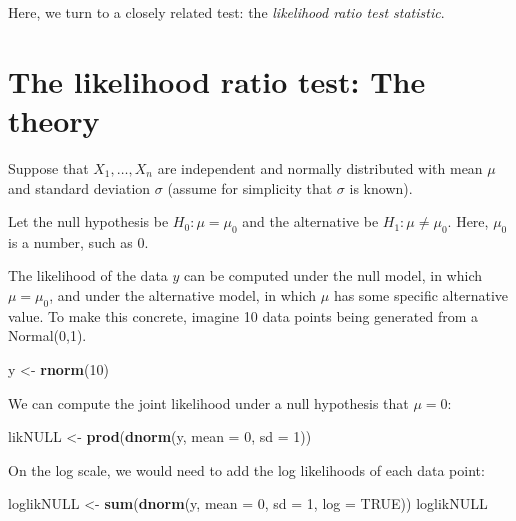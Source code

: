\documentclass[12pt,]{krantz}
\newenvironment{Shaded}{\begin{snugshade}}{\end{snugshade}}
\newcommand{\DataTypeTok}[1]{\textcolor[rgb]{0.13,0.29,0.53}{#1}}
\newcommand{\DecValTok}[1]{\textcolor[rgb]{0.00,0.00,0.81}{#1}}
\newcommand{\KeywordTok}[1]{\textcolor[rgb]{0.13,0.29,0.53}{\textbf{#1}}}
\newcommand{\NormalTok}[1]{#1}
\newcommand{\OtherTok}[1]{\textcolor[rgb]{0.56,0.35,0.01}{#1}}
\newcommand{\StringTok}[1]{\textcolor[rgb]{0.31,0.60,0.02}{#1}}
\begin{document}
Here, we turn to a closely related test: the \emph{likelihood ratio test statistic}.

\hypertarget{the-likelihood-ratio-test-the-theory}{%
\section{The likelihood ratio test: The theory}\label{the-likelihood-ratio-test-the-theory}}

Suppose that \(X_1,\dots, X_n\) are independent and normally distributed with mean \(\mu\) and standard deviation \(\sigma\) (assume for simplicity that \(\sigma\) is known).

Let the null hypothesis be \(H_0: \mu=\mu_0\) and the alternative be \(H_1: \mu\neq \mu_0\). Here, \(\mu_0\) is a number, such as \(0\).

The likelihood of the data \(y\) can be computed under the null model, in which \(\mu=\mu_0\), and under the alternative model, in which \(\mu\) has some specific alternative value. To make this concrete, imagine 10 data points being generated from a Normal(0,1).

\begin{Shaded}
\begin{Highlighting}[]
\NormalTok{y <-}\StringTok{ }\KeywordTok{rnorm}\NormalTok{(}\DecValTok{10}\NormalTok{)}
\end{Highlighting}
\end{Shaded}

We can compute the joint likelihood under a null hypothesis that \(\mu=0\):

\begin{Shaded}
\begin{Highlighting}[]
\NormalTok{likNULL <-}\StringTok{ }\KeywordTok{prod}\NormalTok{(}\KeywordTok{dnorm}\NormalTok{(y, }\DataTypeTok{mean =} \DecValTok{0}\NormalTok{, }\DataTypeTok{sd =} \DecValTok{1}\NormalTok{))}
\end{Highlighting}
\end{Shaded}

On the log scale, we would need to add the log likelihoods of each data point:

\begin{Shaded}
\begin{Highlighting}[]
\NormalTok{loglikNULL <-}\StringTok{ }\KeywordTok{sum}\NormalTok{(}\KeywordTok{dnorm}\NormalTok{(y, }\DataTypeTok{mean =} \DecValTok{0}\NormalTok{, }\DataTypeTok{sd =} \DecValTok{1}\NormalTok{, }
  \DataTypeTok{log =} \OtherTok{TRUE}\NormalTok{))}
\NormalTok{loglikNULL}
\end{Highlighting}
\end{Shaded}
\end{document}
